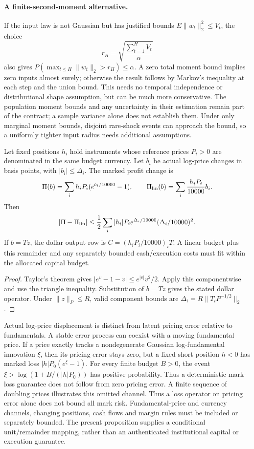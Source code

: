 \paragraph{A finite-second-moment alternative.}
If the input law is not Gaussian but has justified bounds $E\|w_t\|_2^2\le V_t$, the choice
\[
r_H=\sqrt{\frac{\sum_{t=1}^H V_t}{\alpha}}
\]
also gives $P(\max_{t\le H}\|w_t\|_2>r_H)\le\alpha$. A zero total moment bound implies zero inputs almost surely; otherwise the result follows by Markov's inequality at each step and the union bound. This needs no temporal independence or distributional shape assumption, but can be much more conservative. The population moment bounds and any uncertainty in their estimation remain part of the contract; a sample variance alone does not establish them. Under only marginal moment bounds, disjoint rare-shock events can approach the bound, so a uniformly tighter input radius needs additional assumptions.

\begin{proposition}
\label{prop:mark_to_dollar}
Let fixed positions $h_i$ hold instruments whose reference prices $P_i>0$ are denominated in the same budget currency. Let $b_i$ be actual log-price changes in basis points, with $|b_i|\le\Delta_i$. The marked profit change is
\[
\Pi(b)=\sum_i h_iP_i(e^{b_i/10000}-1),\qquad
\Pi_{\rm lin}(b)=\sum_i\frac{h_iP_i}{10000}b_i.
\]
Then
\[
|\Pi-\Pi_{\rm lin}|\le
\frac12\sum_i |h_i|P_i e^{\Delta_i/10000}(\Delta_i/10000)^2.
\]
If $b=Tz$, the dollar output row is $C=(h_iP_i/10000)_iT$. A linear budget plus this remainder and any separately bounded cash/execution costs must fit within the allocated capital budget.
\end{proposition}
\begin{proof}
Taylor's theorem gives $|e^v-1-v|\le e^{|v|}v^2/2$. Apply this componentwise and use the triangle inequality. Substitution of $b=Tz$ gives the stated dollar operator. Under $\|z\|_P\le R$, valid component bounds are $\Delta_i=R\|T_iP^{-1/2}\|_2$.
\end{proof}
Actual log-price displacement is distinct from latent pricing error relative to fundamentals. A stable error process can coexist with a moving fundamental price. If a price exactly tracks a nondegenerate Gaussian log-fundamental innovation $\xi$, then its pricing error stays zero, but a fixed short position $h<0$ has marked loss $|h|P_0(e^\xi-1)$. For every finite budget $B>0$, the event $\xi>\log(1+B/(|h|P_0))$ has positive probability. Thus a deterministic mark-loss guarantee does not follow from zero pricing error. A finite sequence of doubling prices illustrates this omitted channel. Thus a loss operator on pricing error alone does not bound all mark risk. Fundamental-price and currency channels, changing positions, cash flows and margin rules must be included or separately bounded. The present proposition supplies a conditional unit/remainder mapping, rather than an authenticated institutional capital or execution guarantee.

